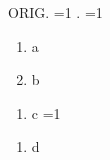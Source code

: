 \documentclass{article}
\def\zz{ORIG}
\begin{document}
\zz.
=1%
\fi\popQED.
=1%
\nocite{zzkey}\fi
\begin{enumerate}\item a \item b\end{enumerate}
\begin{enumerate}[resume]\item c
=1%
\fi
\end{enumerate}
\begin{enumerate}[resume]\item d\end{enumerate}
\end{document}
